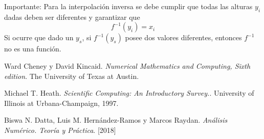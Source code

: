 \documentclass[11pt]{article}
\begin{document}
Importante: Para la interpolación inversa se debe cumplir que todas las alturas $y_i$ dadas deben ser diferentes y garantizar que 
$$ f^{-1}(y_i) = x_i$$
Si ocurre que dado un $y_s$, si $f^{-1}(y_s)$ posee dos valores diferentes, entonces $f^{-1}$ no es una función.




\vspace{1cm}	
\begin{thebibliography}{9}

Ward Cheney y David Kincaid.
\textit{Numerical Mathematics and Computing, Sixth edition}. 
The University of Texas at Austin.

Michael T. Heath. 
\textit{Scientific Computing: An Introductory Survey.}. 
University of Illinois at Urbana-Champaign, 1997.

Biswa N. Datta, Luis M. Hernández-Ramos y Marcos Raydan.
\textit{Análisis Numérico. Teoría y Práctica}. 
[2018]

\end{thebibliography}
\end{document}
